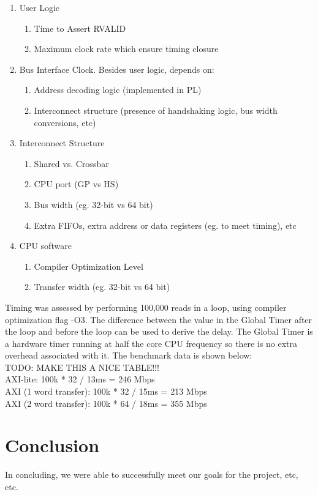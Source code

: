 \documentclass[journal]{IEEEtran}
\begin{document}
\begin{enumerate}
  \item User Logic
  \begin{enumerate}
    \item Time to Assert RVALID
    \item Maximum clock rate which ensure timing closure
  \end{enumerate}
  \item Bus Interface Clock. Besides user logic, depends on: 
  \begin{enumerate}
    \item Address decoding logic (implemented in PL) 
   \item  Interconnect structure (presence of handshaking logic, bus width conversions, etc)
  \end{enumerate}
  \item Interconnect Structure 
 \begin{enumerate}
    \item Shared vs. Crossbar
    \item CPU port (GP vs HS)
    \item Bus width (eg. 32-bit vs 64 bit)
    \item Extra FIFOs, extra address or data registers (eg. to meet timing), etc
  \end{enumerate}
  \item CPU software
 \begin{enumerate}
    \item Compiler Optimization Level
    \item Transfer width (eg. 32-bit vs 64 bit) 
  \end{enumerate}
\end{enumerate}

Timing was assessed by performing 100,000 reads in a loop, using compiler optimization flag -O3. The difference  between the value in the Global Timer after the loop and before the loop can be used to derive the delay. The Global Timer is a hardware timer running at half the core CPU frequency so there is no extra overhead associated with it. The benchmark data is shown below:\\

TODO: MAKE THIS A NICE TABLE!!!\\

AXI-lite: 100k * 32 / 13ms = 246 Mbps\\
AXI (1 word transfer): 100k * 32 / 15ms = 213 Mbps\\
AXI (2 word transfer): 100k * 64 / 18ms = 355 Mbps\\

\section{Conclusion}

In concluding, we were able to successfully meet our goals for the project, etc, etc.  






\end{document}
